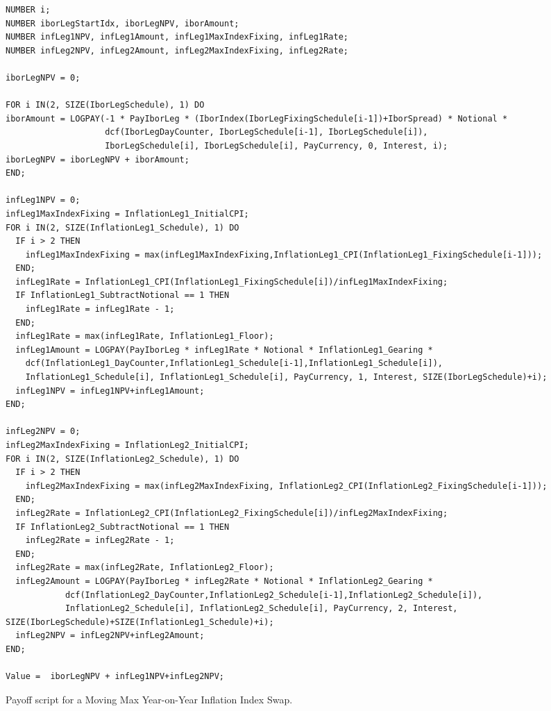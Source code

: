 \begin{listing}[hbt]
  \begin{verbatim}
NUMBER i;
NUMBER iborLegStartIdx, iborLegNPV, iborAmount;
NUMBER infLeg1NPV, infLeg1Amount, infLeg1MaxIndexFixing, infLeg1Rate;
NUMBER infLeg2NPV, infLeg2Amount, infLeg2MaxIndexFixing, infLeg2Rate;

iborLegNPV = 0;

FOR i IN(2, SIZE(IborLegSchedule), 1) DO
iborAmount = LOGPAY(-1 * PayIborLeg * (IborIndex(IborLegFixingSchedule[i-1])+IborSpread) * Notional *
                    dcf(IborLegDayCounter, IborLegSchedule[i-1], IborLegSchedule[i]),
                    IborLegSchedule[i], IborLegSchedule[i], PayCurrency, 0, Interest, i);
iborLegNPV = iborLegNPV + iborAmount;
END;

infLeg1NPV = 0;
infLeg1MaxIndexFixing = InflationLeg1_InitialCPI;
FOR i IN(2, SIZE(InflationLeg1_Schedule), 1) DO
  IF i > 2 THEN
    infLeg1MaxIndexFixing = max(infLeg1MaxIndexFixing,InflationLeg1_CPI(InflationLeg1_FixingSchedule[i-1]));
  END;
  infLeg1Rate = InflationLeg1_CPI(InflationLeg1_FixingSchedule[i])/infLeg1MaxIndexFixing;
  IF InflationLeg1_SubtractNotional == 1 THEN
    infLeg1Rate = infLeg1Rate - 1;
  END;
  infLeg1Rate = max(infLeg1Rate, InflationLeg1_Floor);
  infLeg1Amount = LOGPAY(PayIborLeg * infLeg1Rate * Notional * InflationLeg1_Gearing *
    dcf(InflationLeg1_DayCounter,InflationLeg1_Schedule[i-1],InflationLeg1_Schedule[i]),
    InflationLeg1_Schedule[i], InflationLeg1_Schedule[i], PayCurrency, 1, Interest, SIZE(IborLegSchedule)+i);
  infLeg1NPV = infLeg1NPV+infLeg1Amount;
END;

infLeg2NPV = 0;
infLeg2MaxIndexFixing = InflationLeg2_InitialCPI;
FOR i IN(2, SIZE(InflationLeg2_Schedule), 1) DO
  IF i > 2 THEN
    infLeg2MaxIndexFixing = max(infLeg2MaxIndexFixing, InflationLeg2_CPI(InflationLeg2_FixingSchedule[i-1]));
  END;
  infLeg2Rate = InflationLeg2_CPI(InflationLeg2_FixingSchedule[i])/infLeg2MaxIndexFixing;
  IF InflationLeg2_SubtractNotional == 1 THEN
    infLeg2Rate = infLeg2Rate - 1;
  END;
  infLeg2Rate = max(infLeg2Rate, InflationLeg2_Floor);
  infLeg2Amount = LOGPAY(PayIborLeg * infLeg2Rate * Notional * InflationLeg2_Gearing *
            dcf(InflationLeg2_DayCounter,InflationLeg2_Schedule[i-1],InflationLeg2_Schedule[i]),
            InflationLeg2_Schedule[i], InflationLeg2_Schedule[i], PayCurrency, 2, Interest, SIZE(IborLegSchedule)+SIZE(InflationLeg1_Schedule)+i);
  infLeg2NPV = infLeg2NPV+infLeg2Amount;
END;

Value =  iborLegNPV + infLeg1NPV+infLeg2NPV;
\end{verbatim}
  \caption{Payoff script for a Moving Max Year-on-Year Inflation Index Swap.}
  \label{lst:movingMaxYYIIS}
\end{listing}

